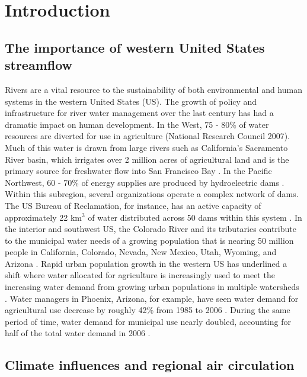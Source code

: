 \documentclass[final, double]{ua-thesis}
\begin{document}
\chapter{Introduction}

\section{The importance of western United States streamflow}

Rivers are a vital resource to the sustainability of both environmental and human systems in the western United States (US). The growth of policy and infrastructure for river water management over the last century has had a dramatic impact on human development. In the West, 75 - 80\% of water resources are diverted for use in agriculture (National Research Council 2007). Much of this water is drawn from large rivers such as California's Sacramento River basin, which irrigates over 2 million acres of agricultural land and is the primary source for freshwater flow into San Francisco Bay \citep{domagalski_national_1994}. In the Pacific Northwest, 60 - 70\% of energy supplies are produced by hydroelectric dams \citep{u.s._bureau_of_reclamation_secure_2016}. Within this subregion, several organizations operate a complex network of dams. The US Bureau of Reclamation, for instance, has an active capacity of approximately 22 km$^3$ of water distributed across 50 dams within this system \citep{u.s._bureau_of_reclamation_secure_2016}. In the interior and southwest US, the Colorado River and its tributaries contribute to the municipal water needs of a growing population that is nearing 50 million people in California, Colorado, Nevada, New Mexico, Utah, Wyoming, and Arizona \citep{u.s._bureau_of_reclamation_secure_2016}. Rapid urban population growth in the western US has underlined a shift where water allocated for agriculture is increasingly used to meet the increasing water demand from growing urban populations in multiple watersheds \citep{national_research_council_colorado_2007}. Water managers in Phoenix, Arizona, for example, have seen water demand for agricultural use decrease by roughly 42\% from 1985 to 2006 \citep{arizona_department_of_water_resources_phoenix_2011}. During the same period of time, water demand for municipal use nearly doubled, accounting for half of the total water demand in 2006 \citep{arizona_department_of_water_resources_phoenix_2011}.

\section{Climate influences and regional air circulation}
\end{document}
